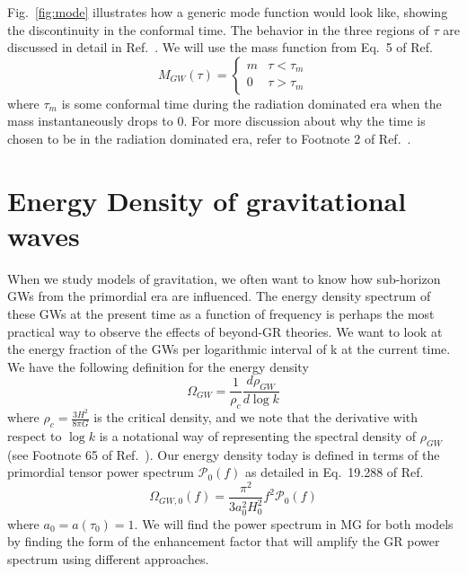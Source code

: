 \documentclass[prd,twocolumn,aps,psfig,nofootinbib,nobibnotes,superscriptaddress,preprintnumbers,times]{revtex4-2}
\begin{document}
Fig.\ \ref{fig:mode} illustrates how a generic mode function would look like, showing  the discontinuity in the conformal time. The behavior in the three regions of $\tau$ are discussed in detail in Ref.\ \cite{Fujita:2018}.
We will use the mass function from Eq.\ 5 of Ref.\ \cite{Fujita:2018}
\begin{equation}\label{eqn:mass_case}
    M_{GW}(\tau) = 
    \begin{cases}
        m & \tau < \tau_m \\
        0 & \tau > \tau_m
   \end{cases}
\end{equation} 
where $\tau_m$ is some conformal time during the radiation dominated era when the mass instantaneously drops to 0. For more discussion about why the time is chosen to be in the radiation dominated era, refer to Footnote 2 of Ref.\ \cite{Fujita:2018}. 

\section{Energy Density of gravitational waves}\label{sec:energy}
When we study models of gravitation, we often want to know how sub-horizon GWs from the primordial era are influenced. The energy density spectrum of these GWs at the present time as a function of frequency is perhaps the most practical way to observe the effects of beyond-GR theories. We want to look at the energy fraction of the GWs per logarithmic interval of k at the current time. We have the following definition for the energy density 
\begin{equation}\label{eqn:omega_sfm}
    \Omega_{GW} = \frac{1}{\rho_c}\frac{d \rho_{GW}} {d \log{k}}
\end{equation}
where $\rho_c = \frac{3H^2}{8\pi G}$ is the critical density, and we note that the derivative with respect to $\log k$ is a notational way of representing the spectral density of $\rho_{GW}$ (see Footnote 65 of Ref.\ \cite{Maggiore:v1}). Our energy density today is defined in terms of the primordial tensor power spectrum $\mathcal{P}_0(f)$ as detailed in Eq.\ 19.288 of Ref.\ \cite{Maggiore:v2}
\begin{equation}\label{eqn:omega_0_sfm}
    \Omega_{GW,0}(f) = \frac{\pi^2}{3a_0^2H_0^2}f^2 \mathcal{P}_0(f)
\end{equation}
where $a_0 = a(\tau_0) = 1$. We will find the power spectrum in MG for both models by finding the form of the enhancement factor that will amplify the GR power spectrum using different approaches.  
\end{document}
